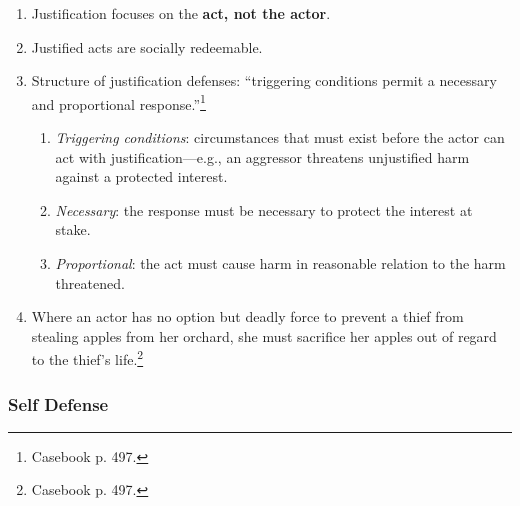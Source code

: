 \begin{enumerate}
    \item Justification focuses on the \textbf{act, not the actor}.
    \item Justified acts are socially redeemable.
    \item Structure of justification defenses: ``triggering conditions permit 
    a necessary and proportional response.''\footnote{Casebook p. 497.}
    \begin{enumerate}
        \item \emph{Triggering conditions}: circumstances that must exist 
        before the actor can act with justification---e.g., an aggressor 
        threatens unjustified harm against a protected interest.
        \item \emph{Necessary}: the response must be necessary to protect the 
        interest at stake.
        \item \emph{Proportional}: the act must cause harm in reasonable 
        relation to the harm threatened.
    \end{enumerate}
    \item Where an actor has no option but deadly force to prevent a thief 
    from stealing apples from her orchard, she must sacrifice her apples out 
    of regard to the thief's life.\footnote{Casebook p. 497.}
\end{enumerate}

\subsubsection{Self Defense}

